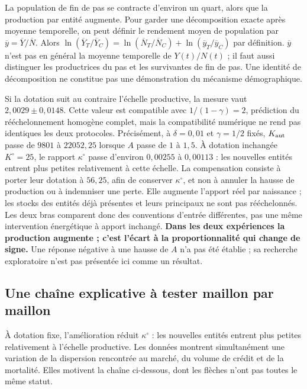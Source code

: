 La population de fin de pas se contracte d'environ un quart, alors que
la production par entité augmente. Pour garder une décomposition exacte
après moyenne temporelle, on peut définir le rendement moyen de population
par $\overline y=\overline Y/\overline N$. Alors
$\ln(\overline Y_T/\overline Y_C)=
\ln(\overline N_T/\overline N_C)+\ln(\overline y_T/\overline y_C)$
par définition. $\overline y$ n'est pas en général la moyenne temporelle
de $Y(t)/N(t)$ ; il faut aussi distinguer les productrices du pas et les
survivantes de fin de pas. Une identité de décomposition ne constitue
pas une démonstration du mécanisme démographique.

Si la dotation suit au contraire l'échelle productive, la mesure vaut
$2{,}0029\pm0{,}0148$. Cette valeur est compatible avec
$1/(1-\gamma)=2$, prédiction du rééchelonnement homogène complet,
mais la compatibilité numérique ne rend pas identiques les deux protocoles.
Précisément, à $\delta=0{,}01$ et $\gamma=1/2$ fixés,
$K_{\rm aut}$ passe de $9801$ à $22052{,}25$ lorsque $A$ passe de
$1$ à $1{,}5$. À dotation inchangée $K^\circ=25$, le rapport
$\kappa^\circ$ passe d'environ $0{,}00255$ à $0{,}00113$ : les
nouvelles entités entrent plus petites relativement à cette échelle.
La compensation consiste à porter leur dotation à $56{,}25$, afin
de conserver $\kappa^\circ$, et non à annuler la hausse de production
ou à indemniser une perte. Elle augmente l'apport réel par naissance ;
les stocks des entités déjà présentes et leurs principaux ne sont pas
rééchelonnés. Les deux bras comparent donc des conventions d'entrée
différentes, pas une même intervention énergétique à apport inchangé.
\textbf{Dans les deux expériences la production augmente ; c'est l'écart
à la proportionnalité qui change de signe.} Une réponse négative à une
hausse de $A$ n'a pas été établie ; sa recherche exploratoire n'est pas
présentée ici comme un résultat.

\subsection{Une chaîne explicative à tester maillon par maillon}
À dotation fixe, l'amélioration réduit $\kappa^\circ$ : les nouvelles
entités entrent plus petites relativement à l'échelle productive.
Les données montrent simultanément une variation de la dispersion rencontrée
au marché, du volume de crédit et de la mortalité. Elles motivent la chaîne
ci-dessous, dont les flèches n'ont pas toutes le même statut.


